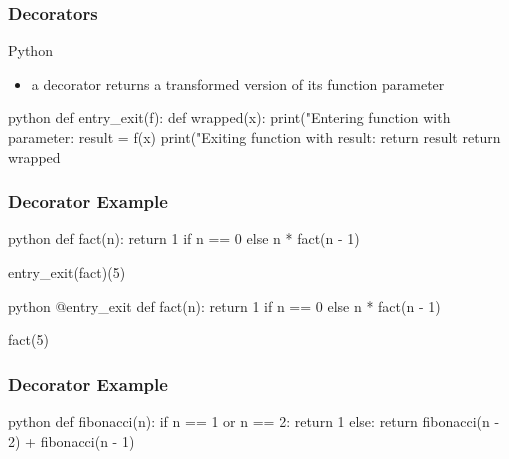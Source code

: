 \documentclass[dvipsnames]{beamer}
\theoremstyle{plain}
\begin{document}
\begin{frame}[fragile]
  \frametitle{Decorators}

  \begin{block}{Python}
    \begin{itemize}
      \item a decorator returns a transformed version of its function parameter
    \end{itemize}
  \end{block}

  \begin{example}[Python]
    \begin{pygments}{python}
def entry_exit(f):
    def wrapped(x):
        print("Entering function with parameter: %
        result = f(x)
        print("Exiting function with result: %
        return result
    return wrapped
    \end{pygments}
  \end{example}
\end{frame}

\begin{frame}[fragile]
  \frametitle{Decorator Example}

  \begin{example}[Python]
    \begin{pygments}{python}
def fact(n):
    return 1 if n == 0 else n * fact(n - 1)

entry_exit(fact)(5)
    \end{pygments}

    \pause
    \medskip
    \begin{pygments}{python}
@entry_exit
def fact(n):
    return 1 if n == 0 else n * fact(n - 1)

fact(5)
    \end{pygments}
  \end{example}
\end{frame}

\begin{frame}[fragile]
  \frametitle{Decorator Example}

  \begin{example}
    \begin{pygments}{python}
def fibonacci(n):
    if n == 1 or n == 2:
        return 1
    else:
        return fibonacci(n - 2) + fibonacci(n - 1)
    \end{pygments}
  \end{example}
\end{frame}
\end{document}
